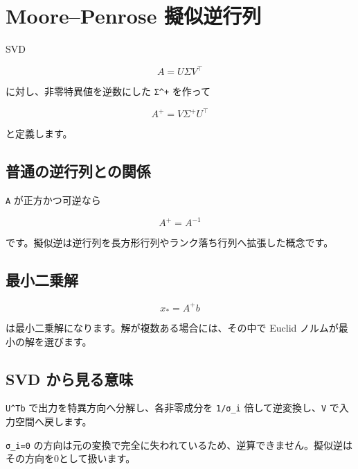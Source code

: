 \documentclass[
  11pt,
  a4paper,
]{ltjsarticle}
\author{}
\date{}
\begin{document}
\hypertarget{moorepenrose-ux64ecux4f3cux9006ux884cux5217}{%
\section{Moore--Penrose
擬似逆行列}\label{moorepenrose-ux64ecux4f3cux9006ux884cux5217}}

SVD

\[
A=U\Sigma V^\top
\]

に対し、非零特異値を逆数にした \texttt{Σ\^{}+} を作って

\[
\boxed{A^+=V\Sigma^+U^\top}
\]

と定義します。

\hypertarget{ux666eux901aux306eux9006ux884cux5217ux3068ux306eux95a2ux4fc2}{%
\subsection{普通の逆行列との関係}\label{ux666eux901aux306eux9006ux884cux5217ux3068ux306eux95a2ux4fc2}}

\texttt{A} が正方かつ可逆なら

\[
A^+=A^{-1}
\]

です。擬似逆は逆行列を長方形行列やランク落ち行列へ拡張した概念です。

\hypertarget{ux6700ux5c0fux4e8cux4e57ux89e3}{%
\subsection{最小二乗解}\label{ux6700ux5c0fux4e8cux4e57ux89e3}}

\[
\boxed{x_*=A^+b}
\]

は最小二乗解になります。解が複数ある場合には、その中で Euclid
ノルムが最小の解を選びます。

\hypertarget{svd-ux304bux3089ux898bux308bux610fux5473}{%
\subsection{SVD
から見る意味}\label{svd-ux304bux3089ux898bux308bux610fux5473}}

\texttt{U\^{}Tb} で出力を特異方向へ分解し、各非零成分を \texttt{1/σ\_i}
倍して逆変換し、\texttt{V} で入力空間へ戻します。

\texttt{σ\_i=0}
の方向は元の変換で完全に失われているため、逆算できません。擬似逆はその方向を0として扱います。
\end{document}
